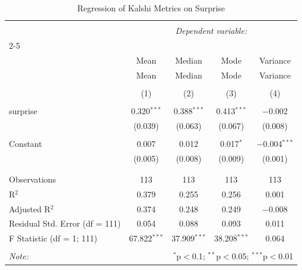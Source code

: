 
\begin{table}[!htbp] \centering 
  \caption{Regression of Kalshi Metrics on Surprise} 
  \label{} 
\begin{tabular}{@{\extracolsep{5pt}}lcccc} 
\\[-1.8ex]\hline 
\hline \\[-1.8ex] 
 & \multicolumn{4}{c}{\textit{Dependent variable:}} \\ 
\cline{2-5} 
\\[-1.8ex] & Mean & Median & Mode & Variance \\ 
 & Mean & Median & Mode & Variance \\ 
\\[-1.8ex] & (1) & (2) & (3) & (4)\\ 
\hline \\[-1.8ex] 
 surprise & 0.320$^{***}$ & 0.388$^{***}$ & 0.413$^{***}$ & $-$0.002 \\ 
  & (0.039) & (0.063) & (0.067) & (0.008) \\ 
  & & & & \\ 
 Constant & 0.007 & 0.012 & 0.017$^{*}$ & $-$0.004$^{***}$ \\ 
  & (0.005) & (0.008) & (0.009) & (0.001) \\ 
  & & & & \\ 
\hline \\[-1.8ex] 
Observations & 113 & 113 & 113 & 113 \\ 
R$^{2}$ & 0.379 & 0.255 & 0.256 & 0.001 \\ 
Adjusted R$^{2}$ & 0.374 & 0.248 & 0.249 & $-$0.008 \\ 
Residual Std. Error (df = 111) & 0.054 & 0.088 & 0.093 & 0.011 \\ 
F Statistic (df = 1; 111) & 67.822$^{***}$ & 37.909$^{***}$ & 38.208$^{***}$ & 0.064 \\ 
\hline 
\hline \\[-1.8ex] 
\textit{Note:}  & \multicolumn{4}{r}{$^{*}$p$<$0.1; $^{**}$p$<$0.05; $^{***}$p$<$0.01} \\ 
\end{tabular} 
\end{table} 
